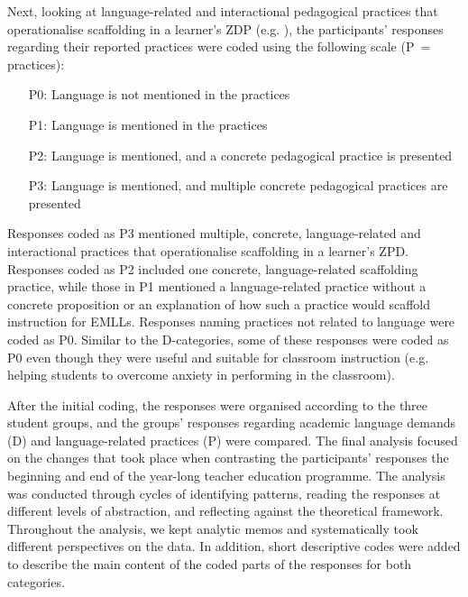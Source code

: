 \documentclass[output=paper]{langscibook}
\begin{document}
Next, looking at language-related and interactional pedagogical practices that operationalise scaffolding in a learner’s ZDP (e.g. \citealt{Gibbons2014,LucasVillegas2013}), the participants’ responses regarding their reported practices were coded using the following scale (P~= practices):

\begin{enumerate}
  \item[P0:]   Language is not mentioned in the practices 
  \item[P1:]   Language is mentioned in the practices 
  \item[P2:]   Language is mentioned, and a concrete pedagogical practice is presented 
  \item[P3:]   Language is mentioned, and multiple concrete pedagogical practices are presented
\end{enumerate}

Responses coded as P3 mentioned multiple, concrete, language-related and interactional practices that operationalise scaffolding in a learner’s ZPD. Responses coded as P2 included one concrete, language-related scaffolding practice, while those in P1 mentioned a language-related practice without a concrete proposition or an explanation of how such a practice would scaffold instruction for EMLLs. Responses naming practices not related to language were coded as P0. Similar to the D-categories, some of these responses were coded as P0 even though they were useful and suitable for classroom instruction (e.g. helping students to overcome anxiety in performing in the classroom). 

\begin{sloppypar}
After the initial coding, the responses were organised according to the three student groups, and the groups’ responses regarding academic language demands (D) and language-related practices (P) were compared.  The final analysis focused on the changes that took place when contrasting the participants’ responses  the beginning and end of the year-long teacher education programme. The analysis was conducted through cycles of identifying patterns, reading the responses at different levels of abstraction, and reflecting against the theoretical framework. Throughout the analysis, we kept analytic memos and systematically took different perspectives on the data. In addition, short descriptive codes were added to describe the main content of the coded parts of the responses for both categories.
\end{sloppypar}
\end{document}
